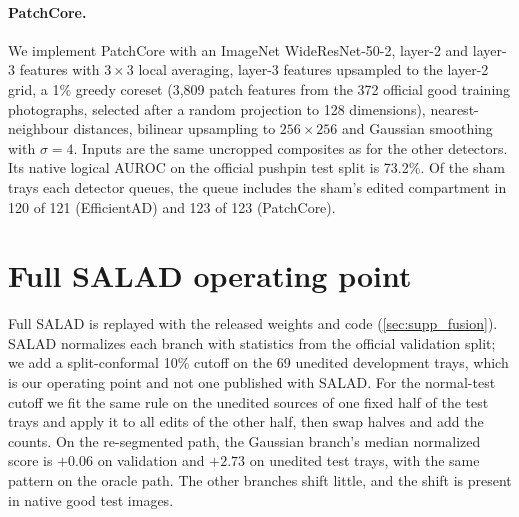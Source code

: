 \paragraph{PatchCore.} We implement PatchCore \cite{roth2022} with an ImageNet WideResNet-50-2, layer-2 and layer-3 features with $3{\times}3$ local averaging, layer-3 features upsampled to the layer-2 grid, a 1\% greedy coreset (3{,}809 patch features from the 372 official good training photographs, selected after a random projection to 128 dimensions), nearest-neighbour distances, bilinear upsampling to $256{\times}256$ and Gaussian smoothing with $\sigma=4$. Inputs are the same uncropped composites as for the other detectors. Its native logical AUROC on the official pushpin test split is 73.2\%. Of the sham trays each detector queues, the queue includes the sham's edited compartment in 120 of 121 (EfficientAD) and 123 of 123 (PatchCore).

\section{Full SALAD operating point}
\label{sec:supp_full}
Full SALAD is replayed with the released weights and code (\cref{sec:supp_fusion}). SALAD normalizes each branch with statistics from the official validation split; we add a split-conformal 10\% cutoff on the 69 unedited development trays, which is our operating point and not one published with SALAD. For the normal-test cutoff we fit the same rule on the unedited sources of one fixed half of the test trays and apply it to all edits of the other half, then swap halves and add the counts. On the re-segmented path, the Gaussian branch's median normalized score is $+0.06$ on validation and $+2.73$ on unedited test trays, with the same pattern on the oracle path. The other branches shift little, and the shift is present in native good test images.
